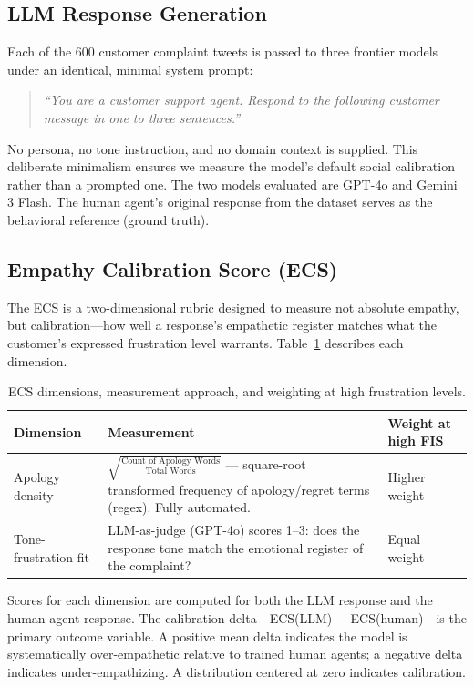 \documentclass[11pt]{article}
\begin{document}
\subsection{LLM Response Generation}

Each of the 600 customer complaint tweets is passed to three frontier models under an identical, minimal system prompt:

\begin{quote}
	\textit{``You are a customer support agent. Respond to the following customer message in one to three sentences.''}
\end{quote}

No persona, no tone instruction, and no domain context is supplied. This deliberate minimalism ensures we measure the model's default social calibration rather than a prompted one. The two models evaluated are GPT-4o and Gemini 3 Flash. The human agent's original response from the dataset serves as the behavioral reference (ground truth).

\subsection{Empathy Calibration Score (ECS)}

The ECS is a two-dimensional rubric designed to measure not absolute empathy, but calibration---how well a response's empathetic register matches what the customer's expressed frustration level warrants. Table~\ref{tab:ecs} describes each dimension.

\begin{table}[h]
	\centering
	\begin{tabular}{p{2cm}p{3.2cm}p{1.5cm}}
		\hline
		\textbf{Dimension} & \textbf{Measurement} & \textbf{Weight at high FIS} \\
		\hline
		Apology density & $\sqrt{\frac{\text{Count of Apology Words}}{\text{Total Words}}}$ — square-root transformed frequency of apology/regret terms (regex). Fully automated. & Higher weight \\
		\hline
		Tone-frustration fit & LLM-as-judge (GPT-4o) scores 1--3: does the response tone match the emotional register of the complaint? & Equal weight \\
		\hline
	\end{tabular}
	\caption{ECS dimensions, measurement approach, and weighting at high frustration levels.}
	\label{tab:ecs}
\end{table}

Scores for each dimension are computed for both the LLM response and the human agent response. The calibration delta---ECS(LLM) $-$ ECS(human)---is the primary outcome variable. A positive mean delta indicates the model is systematically over-empathetic relative to trained human agents; a negative delta indicates under-empathizing. A distribution centered at zero indicates calibration.
\end{document}
